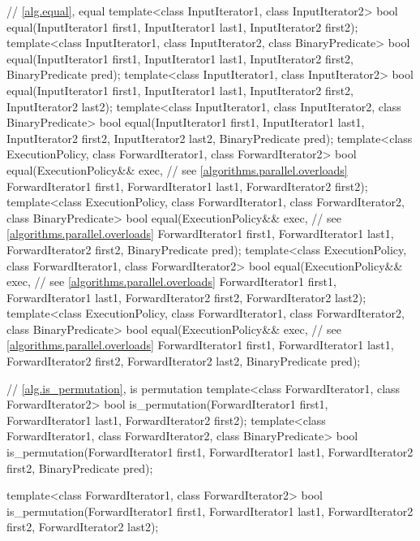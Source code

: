 \begin{codeblock}
{  // \ref{alg.equal}, equal
  template<class InputIterator1, class InputIterator2>
    bool equal(InputIterator1 first1, InputIterator1 last1,
               InputIterator2 first2);
  template<class InputIterator1, class InputIterator2, class BinaryPredicate>
    bool equal(InputIterator1 first1, InputIterator1 last1,
               InputIterator2 first2, BinaryPredicate pred);
  template<class InputIterator1, class InputIterator2>
    bool equal(InputIterator1 first1, InputIterator1 last1,
               InputIterator2 first2, InputIterator2 last2);
  template<class InputIterator1, class InputIterator2, class BinaryPredicate>
    bool equal(InputIterator1 first1, InputIterator1 last1,
               InputIterator2 first2, InputIterator2 last2,
               BinaryPredicate pred);
  template<class ExecutionPolicy, class ForwardIterator1, class ForwardIterator2>
    bool equal(ExecutionPolicy&& exec, // see \ref{algorithms.parallel.overloads}
               ForwardIterator1 first1, ForwardIterator1 last1,
               ForwardIterator2 first2);
  template<class ExecutionPolicy, class ForwardIterator1, class ForwardIterator2,
           class BinaryPredicate>
    bool equal(ExecutionPolicy&& exec, // see \ref{algorithms.parallel.overloads}
               ForwardIterator1 first1, ForwardIterator1 last1,
               ForwardIterator2 first2, BinaryPredicate pred);
  template<class ExecutionPolicy, class ForwardIterator1, class ForwardIterator2>
    bool equal(ExecutionPolicy&& exec, // see \ref{algorithms.parallel.overloads}
               ForwardIterator1 first1, ForwardIterator1 last1,
               ForwardIterator2 first2, ForwardIterator2 last2);
  template<class ExecutionPolicy, class ForwardIterator1, class ForwardIterator2,
           class BinaryPredicate>
    bool equal(ExecutionPolicy&& exec, // see \ref{algorithms.parallel.overloads}
               ForwardIterator1 first1, ForwardIterator1 last1,
               ForwardIterator2 first2, ForwardIterator2 last2,
               BinaryPredicate pred);

  // \ref{alg.is_permutation}, is permutation
  template<class ForwardIterator1, class ForwardIterator2>
    bool is_permutation(ForwardIterator1 first1, ForwardIterator1 last1,
                        ForwardIterator2 first2);
  template<class ForwardIterator1, class ForwardIterator2, class BinaryPredicate>
    bool is_permutation(ForwardIterator1 first1, ForwardIterator1 last1,
                        ForwardIterator2 first2, BinaryPredicate pred);

  template<class ForwardIterator1, class ForwardIterator2>
    bool is_permutation(ForwardIterator1 first1, ForwardIterator1 last1,
                        ForwardIterator2 first2, ForwardIterator2 last2);

}
\end{codeblock}
